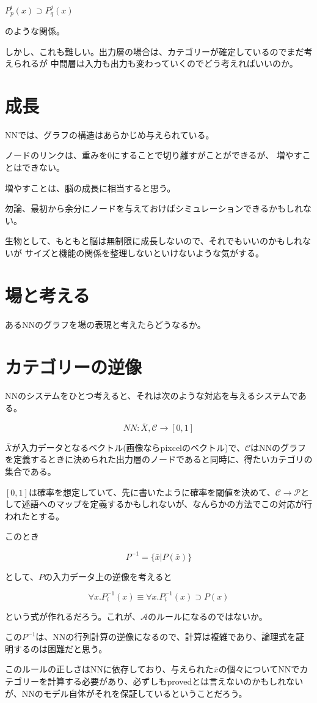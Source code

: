 \documentclass[10pt, oneside]{jarticle}   	%
\begin{document}
$P^i_p(x) \supset P^j_q(x)$

のような関係。

しかし、これも難しい。出力層の場合は、カテゴリーが確定しているのでまだ考えられるが
中間層は入力も出力も変わっていくのでどう考えればいいのか。



\section{成長}
NNでは、グラフの構造はあらかじめ与えられている。

ノードのリンクは、重みを0にすることで切り離すがことができるが、
増やすことはできない。

増やすことは、脳の成長に相当すると思う。

勿論、最初から余分にノードを与えておけばシミュレーションできるかもしれない。

生物として、もともと脳は無制限に成長しないので、それでもいいのかもしれないが
サイズと機能の関係を整理しないといけないような気がする。

\section{場と考える}
あるNNのグラフを場の表現と考えたらどうなるか。



\section{カテゴリーの逆像}
NNのシステムをひとつ考えると、それは次のような対応を与えるシステムである。

$$NN : \bar{X} , \mathcal{C} \to [0,1]$$

$\bar{X}$が入力データとなるベクトル(画像ならpixcelのベクトル)で、$\mathcal{C}$はNNのグラフを定義するときに決められた出力層のノードであると同時に、得たいカテゴリの集合である。

$[0,1]$は確率を想定していて、先に書いたように確率を閾値を決めて、$\mathcal{C} \to \mathcal{P}$として述語へのマップを定義するかもしれないが、なんらかの方法でこの対応が行われたとする。

このとき

$$P^{-1} = \{\bar{x} | P(\bar{x})\}$$

として、$P$の入力データ上の逆像を考えると

\begin{equation}
\forall x.P^{-1}_i(x) \equiv \forall x.P^{-1}_i(x) \supset P(x)
\end{equation}

という式が作れるだろう。これが、$\mathcal{A}$のルールになるのではないか。

この$P^{-1}$は、NNの行列計算の逆像になるので、計算は複雑であり、論理式を証明するのは困難だと思う。

このルールの正しさはNNに依存しており、与えられた$\bar{x}$の個々についてNNでカテゴリーを計算する必要があり、必ずしもprovedとは言えないのかもしれないが、NNのモデル自体がそれを保証しているということだろう。
\end{document}
